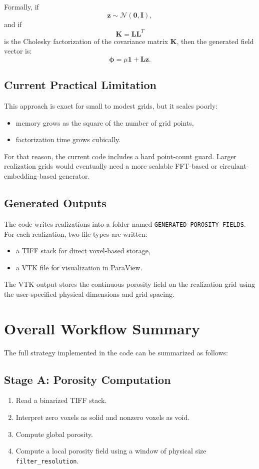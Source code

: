 \documentclass[11pt]{article}
\begin{document}
Formally, if
\[
\bm{z} \sim \mathcal{N}(\bm{0},\bm{I}),
\]
and if
\[
\bm{K} = \bm{L}\bm{L}^T
\]
is the Cholesky factorization of the covariance matrix \(\bm{K}\), then the
generated field vector is:
\[
\bm{\phi} = \mu \bm{1} + \bm{L}\bm{z}.
\]

\subsection{Current Practical Limitation}
This approach is exact for small to modest grids, but it scales poorly:
\begin{itemize}
\item memory grows as the square of the number of grid points,
\item factorization time grows cubically.
\end{itemize}

For that reason, the current code includes a hard point-count guard. Larger
realization grids would eventually need a more scalable FFT-based or
circulant-embedding-based generator.

\subsection{Generated Outputs}
The code writes realizations into a folder named
\texttt{GENERATED\_POROSITY\_FIELDS}. For each realization, two file types are
written:
\begin{itemize}
\item a TIFF stack for direct voxel-based storage,
\item a VTK file for visualization in ParaView.
\end{itemize}

The VTK output stores the continuous porosity field on the realization grid using
the user-specified physical dimensions and grid spacing.

\section{Overall Workflow Summary}
The full strategy implemented in the code can be summarized as follows:

\subsection*{Stage A: Porosity Computation}
\begin{enumerate}[label=\arabic*.]
\item Read a binarized TIFF stack.
\item Interpret zero voxels as solid and nonzero voxels as void.
\item Compute global porosity.
\item Compute a local porosity field using a window of physical size
\texttt{filter\_resolution}.
\end{enumerate}
\end{document}
